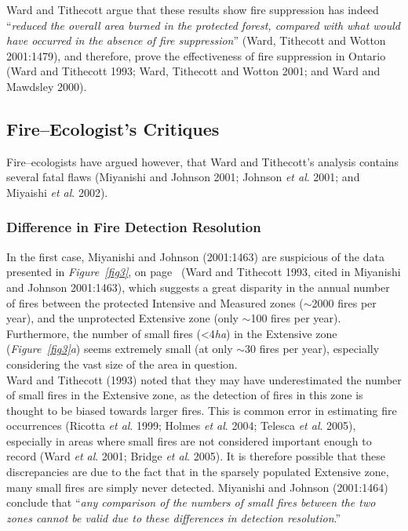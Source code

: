 \begin{spacing}{1.5}
\clearpage

\noindent Ward and Tithecott argue that these results show fire suppression has indeed ``\emph{reduced the overall area burned in the protected forest, compared with what would have occurred in the absence of fire suppression}'' (Ward, Tithecott and Wotton 2001:1479), and therefore, prove the effectiveness of fire suppression in Ontario (Ward and Tithecott 1993; Ward, Tithecott and Wotton 2001; and Ward and Mawdsley 2000).

\subsection{Fire--Ecologist's Critiques}

Fire--ecologists have argued however, that Ward and Tithecott's analysis contains several fatal flaws (Miyanishi and Johnson 2001; Johnson \emph{et al}. 2001; and Miyaishi \emph{et al}. 2002). 

\subsubsection{Difference in Fire Detection Resolution}

In the first case, Miyanishi and Johnson (2001:1463) are suspicious of the data presented in \emph{Figure~\ref{fig3}}, on page~\pageref{fig3} (Ward and Tithecott 1993, cited in Miyanishi and Johnson 2001:1463), which suggests a great disparity in the annual number of fires between the protected Intensive and Measured zones ($\sim$2000 fires per year), and the unprotected Extensive zone (only $\sim$100 fires per year). Furthermore, the number of small fires (<4\emph{ha}) in the Extensive zone (\emph{Figure~\ref{fig3}a}) seems extremely small (at only $\sim$30 fires per year), especially considering the vast size of the area in question. \\ 

\noindent Ward and Tithecott (1993) noted that they may have underestimated the number of small fires in the Extensive zone, as the detection of fires in this zone is thought to be biased towards larger fires. This is common error in estimating fire occurrences (Ricotta \emph{et al}. 1999; Holmes \emph{et al}. 2004; Telesca \emph{et al}. 2005), especially in areas where small fires are not considered important enough to record (Ward \emph{et al}. 2001; Bridge \emph{et al}. 2005). It is therefore possible that these discrepancies are due to the fact that in the sparsely populated Extensive zone, many small fires are simply never detected. Miyanishi and Johnson (2001:1464) conclude that ``\emph{any comparison of the numbers of small fires between the two zones cannot be valid due to these differences in detection resolution}.'' \\


\end{spacing}

